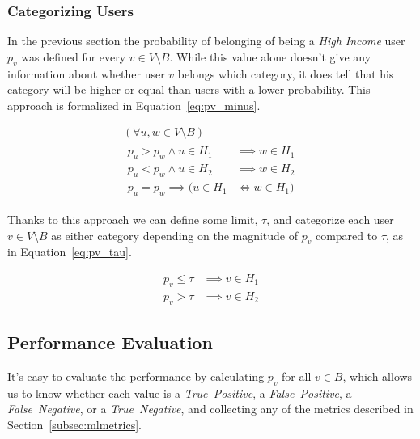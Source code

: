 \subsubsection{Categorizing Users}

In the previous section the probability of belonging of being a \emph{High Income} user $p_v$ was defined for every $v \in V \setminus B$. While this value alone doesn't give any information about whether user $v$ belongs which category, it does tell that his category will be higher or equal than users with a lower probability. This approach is formalized in Equation~\ref{eq:pv_minus}.

\begin{equation}
\label{eq:pv_minus}
\begin{gathered}
	\left( \forall u, w \in V \setminus B \right) \\
	\begin{aligned}
		p_u > p_w \land u \in H_1 &\implies w \in H_1 \\
		p_u < p_w \land u \in H_2 &\implies w \in H_2 \\
		p_u = p_w \implies ( u \in H_1 &\iff w \in H_1 )
	\end{aligned}
\end{gathered}
\end{equation}

Thanks to this approach we can define some limit, $\tau$, and categorize each user $v \in V \setminus B$ as either category depending on the magnitude of $p_v$ compared to $\tau$, as in Equation~\ref{eq:pv_tau}.

\begin{equation}
\label{eq:pv_tau}
\begin{aligned}
p_v \leq \tau &\implies v \in H_1 \\
p_v > \tau &\implies v \in H_2
\end{aligned}
\end{equation}

\subsection{Performance Evaluation}
\label{subsec:performance_evaluation}

It's easy to evaluate the performance by calculating $p_v$ for all $v \in B$, which allows us to know whether each value is a \emph{True~Positive}, a \emph{False~Positive}, a \emph{False~Negative}, or a \emph{True~Negative}, and collecting any of the metrics described in Section~\ref{subsec:mlmetrics}.

